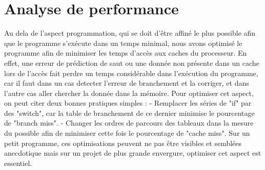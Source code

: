 \documentclass{report}
\begin{document}
\chapter{Analyse de performance}
Au dela de l'aspect programmation, qui se doit d'être affiné le plus possible afin que le programme s’exécute dans un temps minimal, nous avons optimisé le programme afin de minimiser les temps d'accès aux caches du processeur.
En effet, une erreur de prédiction de saut ou une donnée non présente dans un cache lors de l’accès fait perdre un temps considérable dans l'exécution du programme, car il faut dans un cas detecter l'erreur de branchement et la corriger, et dans l'autre cas aller chercher la donnée dans la mémoire.
Pour optimiser cet aspect, on peut citer deux bonnes pratiques simples : 
\newline
- Remplacer les séries de "if" par des "switch", car la table de branchement de ce dernier minimise le pourcentage de "branch miss". 
\newline
- Changer les ordres de parcours des tableaux dans la mesure du possible afin de minimiser cette fois le pourcentage de "cache miss".
\newline
Sur un petit programme, ces optimisations peuvent ne pas être visibles et semblées anecdotique mais sur un projet de plus grande envergure, optimiser cet aspect est essentiel.
\end{document}
